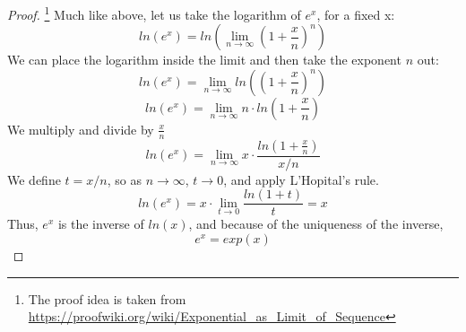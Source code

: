 \documentclass[12pt,oneside,a4paper]{article}
\begin{document}
\begin{proof}\footnote{The proof idea is taken from  \url{https://proofwiki.org/wiki/Exponential_as_Limit_of_Sequence} } Much like above, let us take the logarithm of $e^x$, for a fixed x:
\begin{equation}
ln(e^x) = ln\left( \lim_{n \to \infty} \left(1+\frac{x}{n}\right)^n \right)
\end{equation}
We can place the logarithm inside the limit and then take the exponent $n$ out: 
\begin{equation}
ln(e^x) = \lim_{n \to \infty}ln\left(  \left(1+\frac{x}{n}\right)^n \right)
\end{equation}
\begin{equation}
ln(e^x) = \lim_{n \to \infty}n \cdot ln\left(1+\frac{x}{n}\right)
\end{equation}
We multiply and divide by $\frac{x}{n}$
\begin{equation}
ln(e^x) = \lim_{n \to \infty} x\cdot \frac{ln\left(1+\frac{x}{n}\right)}{x/n}
\end{equation}
We define $t=x/n$, so as $n \to \infty$, $t \to 0$, and apply L'Hopital's rule.
\begin{equation}
ln(e^x) = x \cdot \lim_{t \to 0}\frac{ln\left(1+t \right)}{t} = x
\end{equation}
Thus, $e^x$ is the inverse of $ln(x)$, and because of the uniqueness of the inverse,
\begin{equation}
e^x = exp(x)
\end{equation}
\end{proof}
\end{document}
